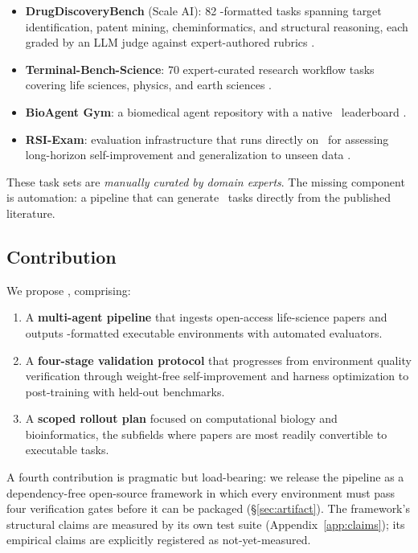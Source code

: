 \begin{itemize}
  \item \textbf{DrugDiscoveryBench} (Scale AI): 82 \harbor-formatted tasks
        spanning target identification, patent mining, cheminformatics, and
        structural reasoning, each graded by an LLM judge against
        expert-authored rubrics \cite{drugdiscoverybench}.
  \item \textbf{Terminal-Bench-Science}: 70 expert-curated research workflow
        tasks covering life sciences, physics, and earth sciences
        \cite{tbscience}.
  \item \textbf{BioAgent Gym}: a biomedical agent repository with a native
        \harbor\ leaderboard \cite{bioagentgym}.
  \item \textbf{RSI-Exam}: evaluation infrastructure that runs directly on
        \harbor\ for assessing long-horizon self-improvement and generalization
        to unseen data \cite{rsiexam}.
\end{itemize}

These task sets are \emph{manually curated by domain experts}. The missing
component is automation: a pipeline that can generate \harbor\ tasks directly
from the published literature.

\subsection{Contribution}

We propose \sys, comprising:

\begin{enumerate}
  \item A \textbf{multi-agent pipeline} that ingests open-access life-science
        papers and outputs \harbor-formatted executable environments with
        automated evaluators.
  \item A \textbf{four-stage validation protocol} that progresses from
        environment quality verification through weight-free self-improvement
        and harness optimization to post-training with held-out benchmarks.
  \item A \textbf{scoped rollout plan} focused on computational biology and
        bioinformatics, the subfields where papers are most readily convertible
        to executable tasks.
\end{enumerate}

A fourth contribution is pragmatic but load-bearing: we release the pipeline as
a dependency-free open-source framework in which every environment must pass
four verification gates before it can be packaged (\S\ref{sec:artifact}). The
framework's structural claims are measured by its own test suite
(Appendix~\ref{app:claims}); its empirical claims are explicitly registered as
not-yet-measured.

